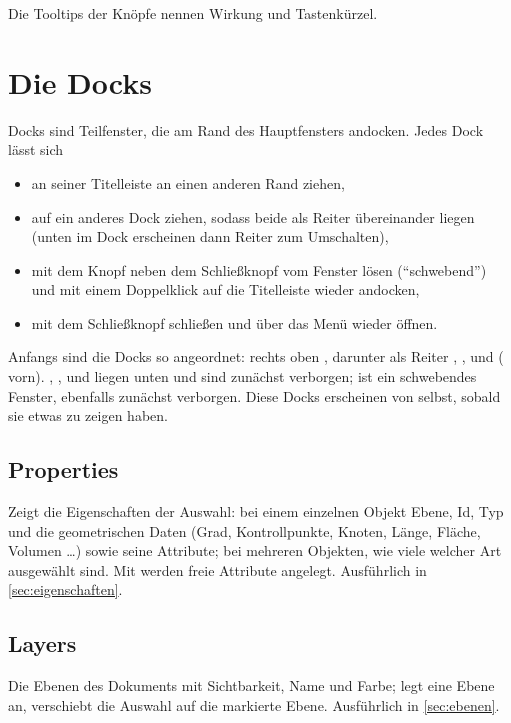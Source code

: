 Die Tooltips der Knöpfe nennen Wirkung und Tastenkürzel.

\section{Die Docks}\label{sec:docks}

Docks sind Teilfenster, die am Rand des Hauptfensters andocken. Jedes Dock lässt sich

\begin{itemize}
  \item an seiner Titelleiste an einen anderen Rand ziehen,
  \item auf ein anderes Dock ziehen, sodass beide als Reiter übereinander liegen (unten im
    Dock erscheinen dann Reiter zum Umschalten),
  \item mit dem Knopf neben dem Schließknopf vom Fenster lösen (\enquote{schwebend}) und mit
    einem Doppelklick auf die Titelleiste wieder andocken,
  \item mit dem Schließknopf schließen und über das Menü  wieder öffnen.
\end{itemize}

Anfangs sind die Docks so angeordnet: rechts oben , darunter als Reiter
, ,  und  ( vorn). ,
,  und  liegen unten und sind zunächst
verborgen;  ist ein schwebendes Fenster, ebenfalls zunächst verborgen. Diese Docks
erscheinen von selbst, sobald sie etwas zu zeigen haben.

\subsection{Properties}\label{sec:dock-properties}

Zeigt die Eigenschaften der Auswahl: bei einem einzelnen Objekt Ebene, Id, Typ und die
geometrischen Daten (Grad, Kontrollpunkte, Knoten, Länge, Fläche, Volumen \dots) sowie seine
Attribute; bei mehreren Objekten, wie viele welcher Art ausgewählt sind. Mit  werden freie Attribute angelegt. Ausführlich in \autoref{sec:eigenschaften}.

\subsection{Layers}

Die Ebenen des Dokuments mit Sichtbarkeit, Name und Farbe;  legt eine Ebene
an,  verschiebt die Auswahl auf die markierte Ebene. Ausführlich in
\autoref{sec:ebenen}.

